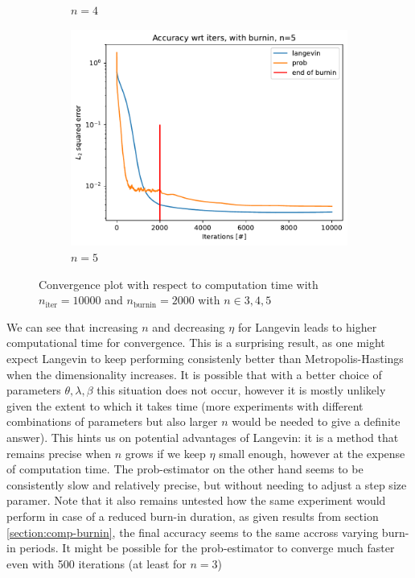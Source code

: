 \documentclass[12pt]{memoir}
\newcommand{\nitern}[1]{$n_{\text{iter}}=#1$}
\newcommand{\nburninn}[1]{$n_{\text{burnin}}=#1$}
\begin{document}
\begin{figure}[H]
\begin{subfigure}[b]{0.49\textwidth}
        \caption{$n=4$}
        \label{fig:conv-plot-time-diff-n-4-sub}
    \end{subfigure}
    \begin{subfigure}[b]{0.49\textwidth}
        \centering
        \includegraphics[width=\textwidth]{figures/experiments/baseline/diff_n_qubits/iters_acc_comp_iters_no_avg_n5-1.png}
        \caption{$n=5$}
        \label{fig:conv-plot-time-diff-n-5-sub}
    \end{subfigure}
    \caption{Convergence plot with respect to computation time with \nitern{10000} and \nburninn{2000} with $n\in{3,4,5}$}
    \label{fig:conv-plot-time-diff-n}
\end{figure}

We can see that increasing $n$ and decreasing $\eta$ for Langevin leads to higher computational time for convergence. This is a surprising result, as one might expect Langevin to keep performing consistenly better than Metropolis-Hastings when the dimensionality increases. It is possible that with a better choice of parameters $\theta, \lambda,\beta$ this situation does not occur, however it is mostly unlikely given the extent to which it takes time (more experiments with different combinations of parameters but also larger $n$ would be needed to give a definite answer). This hints us on potential advantages of Langevin: it is a method that remains precise when $n$ grows if we keep $\eta$ small enough, however at the expense of computation time. The prob-estimator on the other hand seems to be consistently slow and relatively precise, but without needing to adjust a step size paramer. Note that it also remains untested how the same experiment would perform in case of a reduced burn-in duration, as given results from section \ref{section:comp-burnin}, the final accuracy seems to the same accross varying burn-in periods. It might be possible for the prob-estimator to converge much faster even with 500 iterations (at least for $n=3$)\medbreak
\end{document}
